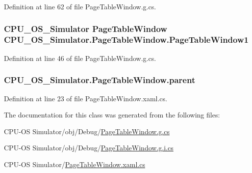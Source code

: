 Definition at line 62 of file Page\+Table\+Window.\+g.\+cs.

\hypertarget{class_c_p_u___o_s___simulator_1_1_page_table_window_ac72a468cc382de9caf8ccac13b35d755}{}
\subsubsection[{Page\+Table\+Window1}]{\setlength{\rightskip}{0pt plus 5cm}C\+P\+U\+\_\+\+O\+S\+\_\+\+Simulator {\bf Page\+Table\+Window} C\+P\+U\+\_\+\+O\+S\+\_\+\+Simulator.\+Page\+Table\+Window.\+Page\+Table\+Window1\hspace{0.3cm}{\ttfamily [package]}}\label{class_c_p_u___o_s___simulator_1_1_page_table_window_ac72a468cc382de9caf8ccac13b35d755}


Definition at line 46 of file Page\+Table\+Window.\+g.\+cs.

\hypertarget{class_c_p_u___o_s___simulator_1_1_page_table_window_a1903e0b83820829549f74207cd209337}{}
\subsubsection[{parent}]{ C\+P\+U\+\_\+\+O\+S\+\_\+\+Simulator.\+Page\+Table\+Window.\+parent\hspace{0.3cm}{\ttfamily [private]}}\label{class_c_p_u___o_s___simulator_1_1_page_table_window_a1903e0b83820829549f74207cd209337}


Definition at line 23 of file Page\+Table\+Window.\+xaml.\+cs.



The documentation for this class was generated from the following files\+:\begin{DoxyCompactItemize}
\item 
C\+P\+U-\/\+O\+S Simulator/obj/\+Debug/\hyperlink{_page_table_window_8g_8cs}{Page\+Table\+Window.\+g.\+cs}\item 
C\+P\+U-\/\+O\+S Simulator/obj/\+Debug/\hyperlink{_page_table_window_8g_8i_8cs}{Page\+Table\+Window.\+g.\+i.\+cs}\item 
C\+P\+U-\/\+O\+S Simulator/\hyperlink{_page_table_window_8xaml_8cs}{Page\+Table\+Window.\+xaml.\+cs}\end{DoxyCompactItemize}
